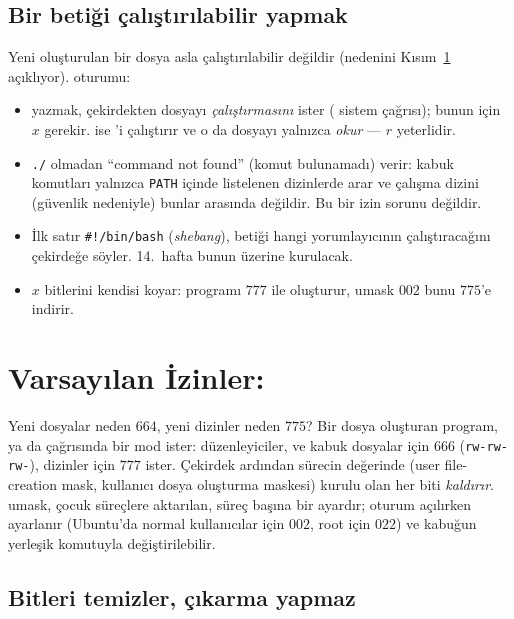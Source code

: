 \subsection{Bir betiği çalıştırılabilir yapmak}
\label{sec:script}

Yeni oluşturulan bir dosya asla çalıştırılabilir değildir (nedenini Kısım~\ref{sec:umask} açıklıyor).  oturumu:



\begin{itemize}
  \item {} yazmak, çekirdekten dosyayı \emph{çalıştırmasını} ister ( sistem çağrısı); bunun için $x$ gerekir.  ise 'i çalıştırır ve o da dosyayı yalnızca \emph{okur} --- $r$ yeterlidir.
  \item \texttt{./} olmadan  ``command not found'' (komut bulunamadı) verir: kabuk komutları yalnızca \texttt{PATH} içinde listelenen dizinlerde arar ve çalışma dizini (güvenlik nedeniyle) bunlar arasında değildir. Bu bir izin sorunu değildir.
  \item İlk satır \texttt{\#!/bin/bash} (\emph{shebang}), betiği hangi yorumlayıcının çalıştıracağını çekirdeğe söyler. 14.~hafta bunun üzerine kurulacak.
  \item {} $x$ bitlerini kendisi koyar: programı $777$ ile oluşturur, umask $002$ bunu $775$'e indirir.
\end{itemize}

\section{Varsayılan İzinler: }
\label{sec:umask}

Yeni dosyalar neden $664$, yeni dizinler neden $775$? Bir dosya oluşturan program,  ya da  çağrısında bir mod ister: düzenleyiciler,  ve kabuk dosyalar için $666$ (\texttt{rw-rw-rw-}), dizinler için $777$ ister. Çekirdek ardından sürecin  değerinde (user file-creation mask, kullanıcı dosya oluşturma maskesi) kurulu olan her biti \emph{kaldırır}. umask, çocuk süreçlere aktarılan, süreç başına bir ayardır; oturum açılırken ayarlanır (Ubuntu'da normal kullanıcılar için $002$, root için $022$) ve kabuğun yerleşik  komutuyla değiştirilebilir.

\subsection{Bitleri temizler, çıkarma yapmaz}

